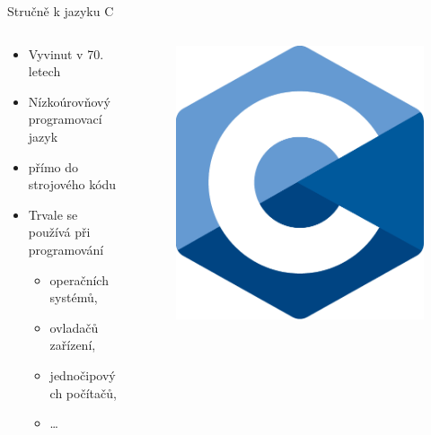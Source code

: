 \documentclass[14pt]{beamer}
\begin{document}
    \begin{frame}[t]{Stručně k jazyku C}
        \begin{columns}[t]
            \begin{column}{.75\textwidth}
                \begin{itemize}
                    \item Vyvinut v 70. letech
                    \item Nízkoúrovňový programovací jazyk
                    \item {} přímo do strojového kódu
                    \item Trvale se používá při programování
                    \begin{itemize}
                        \item operačních systémů,
                        \item ovladačů zařízení,
                        \item jednočipových počítačů,
                        \item \dots
                    \end{itemize}
                \end{itemize}
            \end{column}
            \begin{column}{.25\textwidth}
                \begin{figure}[H]
                    \centering
                    \includegraphics[scale=.25]{images/C_programming_language_logo.pdf}
                \end{figure}
            \end{column}
        \end{columns}
    \end{frame}
\end{document}
